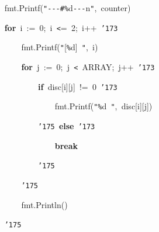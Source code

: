 \documentclass[a4paper,10pt]{article}
\def\mc{\relax}
\begin{document}
\noindent
\mbox{}{\tt\mc \ }{\tt\mc \ }{\tt\mc \ }{\tt\mc \ }fmt.Printf({\tt "}{\tt -}{\tt -}{\tt -}{\tt\#}{\tt\%}d{\tt -}{\tt -}{\tt -}{\tt{}}n{\tt "},{\tt\mc \ }counter)

\noindent
\mbox{}{\tt\mc \ }{\tt\mc \ }{\tt\mc \ }{\tt\mc \ }\textbf{for}{\tt\mc \ }i{\tt\mc \ }:={\tt\mc \ }0;{\tt\mc \ }i{\tt\mc \ }{\tt <}={\tt\mc \ }2;{\tt\mc \ }i++{\tt\mc \ }{\tt\char'173}

\noindent
\mbox{}{\tt\mc \ }{\tt\mc \ }{\tt\mc \ }{\tt\mc \ }{\tt\mc \ }{\tt\mc \ }{\tt\mc \ }{\tt\mc \ }fmt.Printf({\tt "}[{\tt\%}d]{\tt\mc \ }{\tt "},{\tt\mc \ }i)

\noindent
\mbox{}{\tt\mc \ }{\tt\mc \ }{\tt\mc \ }{\tt\mc \ }{\tt\mc \ }{\tt\mc \ }{\tt\mc \ }{\tt\mc \ }\textbf{for}{\tt\mc \ }j{\tt\mc \ }:={\tt\mc \ }0;{\tt\mc \ }j{\tt\mc \ }{\tt <}{\tt\mc \ }ARRAY;{\tt\mc \ }j++{\tt\mc \ }{\tt\char'173}

\noindent
\mbox{}{\tt\mc \ }{\tt\mc \ }{\tt\mc \ }{\tt\mc \ }{\tt\mc \ }{\tt\mc \ }{\tt\mc \ }{\tt\mc \ }{\tt\mc \ }{\tt\mc \ }{\tt\mc \ }{\tt\mc \ }\textbf{if}{\tt\mc \ }disc[i][j]{\tt\mc \ }!={\tt\mc \ }0{\tt\mc \ }{\tt\char'173}

\noindent
\mbox{}{\tt\mc \ }{\tt\mc \ }{\tt\mc \ }{\tt\mc \ }{\tt\mc \ }{\tt\mc \ }{\tt\mc \ }{\tt\mc \ }{\tt\mc \ }{\tt\mc \ }{\tt\mc \ }{\tt\mc \ }{\tt\mc \ }{\tt\mc \ }{\tt\mc \ }{\tt\mc \ }fmt.Printf({\tt "}{\tt\%}d{\tt\mc \ }{\tt "},{\tt\mc \ }disc[i][j])

\noindent
\mbox{}{\tt\mc \ }{\tt\mc \ }{\tt\mc \ }{\tt\mc \ }{\tt\mc \ }{\tt\mc \ }{\tt\mc \ }{\tt\mc \ }{\tt\mc \ }{\tt\mc \ }{\tt\mc \ }{\tt\mc \ }{\tt\char'175}{\tt\mc \ }\textbf{else}{\tt\mc \ }{\tt\char'173}

\noindent
\mbox{}{\tt\mc \ }{\tt\mc \ }{\tt\mc \ }{\tt\mc \ }{\tt\mc \ }{\tt\mc \ }{\tt\mc \ }{\tt\mc \ }{\tt\mc \ }{\tt\mc \ }{\tt\mc \ }{\tt\mc \ }{\tt\mc \ }{\tt\mc \ }{\tt\mc \ }{\tt\mc \ }\textbf{break}

\noindent
\mbox{}{\tt\mc \ }{\tt\mc \ }{\tt\mc \ }{\tt\mc \ }{\tt\mc \ }{\tt\mc \ }{\tt\mc \ }{\tt\mc \ }{\tt\mc \ }{\tt\mc \ }{\tt\mc \ }{\tt\mc \ }{\tt\char'175}

\noindent
\mbox{}{\tt\mc \ }{\tt\mc \ }{\tt\mc \ }{\tt\mc \ }{\tt\mc \ }{\tt\mc \ }{\tt\mc \ }{\tt\mc \ }{\tt\char'175}

\noindent
\mbox{}{\tt\mc \ }{\tt\mc \ }{\tt\mc \ }{\tt\mc \ }{\tt\mc \ }{\tt\mc \ }{\tt\mc \ }{\tt\mc \ }fmt.Println()

\noindent
\mbox{}{\tt\mc \ }{\tt\mc \ }{\tt\mc \ }{\tt\mc \ }{\tt\char'175}
\end{document}
